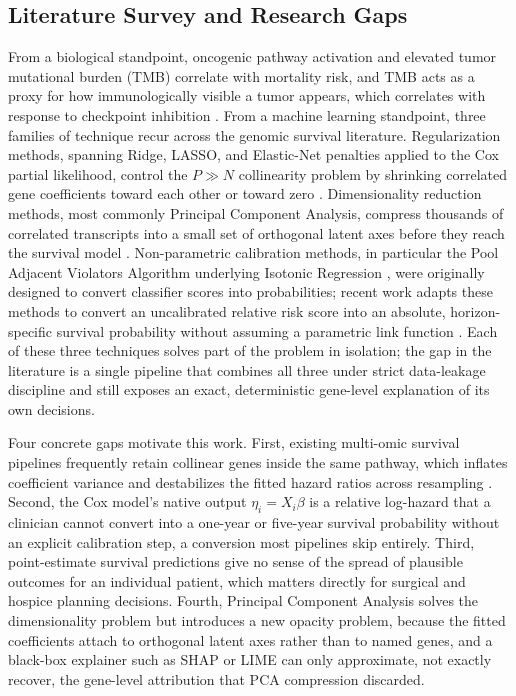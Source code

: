 \documentclass[sigconf, review=true]{acmart}
\begin{document}
\subsection{Literature Survey and Research Gaps}
From a biological standpoint, oncogenic pathway activation and elevated tumor mutational burden (TMB) correlate with mortality risk, and TMB acts as a proxy for how immunologically visible a tumor appears, which correlates with response to checkpoint inhibition \cite{chalmers2017mutational}. From a machine learning standpoint, three families of technique recur across the genomic survival literature. Regularization methods, spanning Ridge, LASSO, and Elastic-Net penalties applied to the Cox partial likelihood, control the $P \gg N$ collinearity problem by shrinking correlated gene coefficients toward each other or toward zero \cite{simon2011regularization, wu2012elastic, tibshirani1997lasso}. Dimensionality reduction methods, most commonly Principal Component Analysis, compress thousands of correlated transcripts into a small set of orthogonal latent axes before they reach the survival model \cite{bishop2006pattern, hastie2009elements}. Non-parametric calibration methods, in particular the Pool Adjacent Violators Algorithm underlying Isotonic Regression \cite{zadrozny2002transforming}, were originally designed to convert classifier scores into probabilities; recent work adapts these methods to convert an uncalibrated relative risk score into an absolute, horizon-specific survival probability without assuming a parametric link function \cite{jain2024isotonic}. Each of these three techniques solves part of the problem in isolation; the gap in the literature is a single pipeline that combines all three under strict data-leakage discipline and still exposes an exact, deterministic gene-level explanation of its own decisions.

Four concrete gaps motivate this work. First, existing multi-omic survival pipelines frequently retain collinear genes inside the same pathway, which inflates coefficient variance and destabilizes the fitted hazard ratios across resampling \cite{simon2011regularization}. Second, the Cox model's native output $\eta_i = X_i \beta$ is a relative log-hazard that a clinician cannot convert into a one-year or five-year survival probability without an explicit calibration step, a conversion most pipelines skip entirely. Third, point-estimate survival predictions give no sense of the spread of plausible outcomes for an individual patient, which matters directly for surgical and hospice planning decisions. Fourth, Principal Component Analysis solves the dimensionality problem but introduces a new opacity problem, because the fitted coefficients attach to orthogonal latent axes rather than to named genes, and a black-box explainer such as SHAP or LIME can only approximate, not exactly recover, the gene-level attribution that PCA compression discarded.
\end{document}
